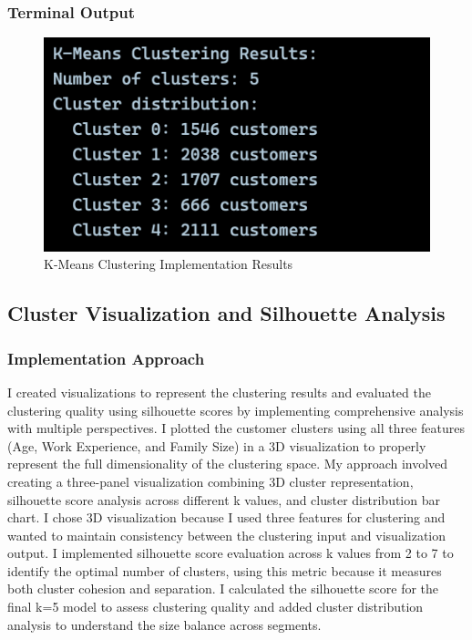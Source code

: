 \documentclass[12pt,a4paper]{article}
\begin{document}
\newpage
\subsubsection{Terminal Output}

\begin{figure}[htbp]
\centering
\includegraphics[width=\textwidth]{Figures/clustering.png}
\caption{K-Means Clustering Implementation Results}
\end{figure}

\subsection{Cluster Visualization and Silhouette Analysis}

\subsubsection{Implementation Approach}
I created visualizations to represent the clustering results and evaluated the clustering quality using silhouette scores by implementing comprehensive analysis with multiple perspectives. I plotted the customer clusters using all three features (Age, Work Experience, and Family Size) in a 3D visualization to properly represent the full dimensionality of the clustering space. My approach involved creating a three-panel visualization combining 3D cluster representation, silhouette score analysis across different k values, and cluster distribution bar chart. I chose 3D visualization because I used three features for clustering and wanted to maintain consistency between the clustering input and visualization output. I implemented silhouette score evaluation across k values from 2 to 7 to identify the optimal number of clusters, using this metric because it measures both cluster cohesion and separation. I calculated the silhouette score for the final k=5 model to assess clustering quality and added cluster distribution analysis to understand the size balance across segments.
\end{document}
